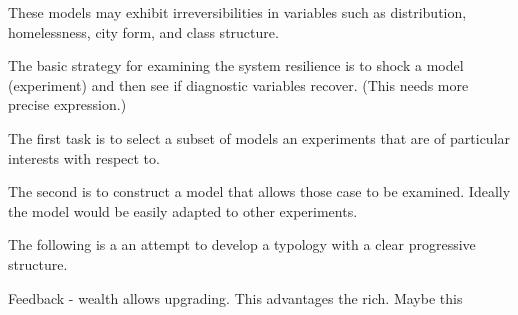 These models may exhibit irreversibilities in variables such as distribution, homelessness, city form, and class structure. 

The basic strategy for examining the system resilience is to shock a model (experiment) and then see if diagnostic variables recover. (This needs more precise expression.)

The first task is to select a subset of models an experiments that are of particular interests with respect to.

The second is to construct a model that allows those case to be examined. Ideally the model would be easily adapted to other experiments.

The following is a an attempt to develop a typology with a clear progressive structure.

Feedback - wealth allows upgrading. This advantages the rich. Maybe this 

